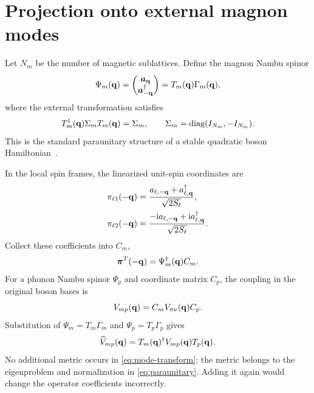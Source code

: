 \section{Projection onto external magnon modes}
\label{sec:magnons}

Let $N_m$ be the number of magnetic sublattices. Define the magnon Nambu spinor
\begin{equation}
\Psi_m(\mathbf q)=
\begin{pmatrix}\bm a_{\mathbf q}\\ \bm a_{-\mathbf q}^\dagger\end{pmatrix}
=T_m(\mathbf q)\Gamma_m(\mathbf q),
\label{eq:magnon-nambu}
\end{equation}
where the external transformation satisfies
\begin{equation}
T_m^\dagger(\mathbf q)\Sigma_m T_m(\mathbf q)=\Sigma_m,
\qquad
\Sigma_m=\operatorname{diag}(I_{N_m},-I_{N_m}).
\label{eq:paraunitary}
\end{equation}
This is the standard paraunitary structure of a stable quadratic boson Hamiltonian~\cite{Colpa1978}.

In the local spin frames, the linearized unit-spin coordinates are
\begin{align}
\pi_{\ell1}(-\mathbf q)
&=\frac{a_{\ell,-\mathbf q}+a_{\ell,\mathbf q}^\dagger}{\sqrt{2S_\ell}},\\
\pi_{\ell2}(-\mathbf q)
&=\frac{-\mathrm{i} a_{\ell,-\mathbf q}+\mathrm{i} a_{\ell,\mathbf q}^\dagger}{\sqrt{2S_\ell}}.
\label{eq:hp-linear}
\end{align}
Collect these coefficients into $C_m$,
\begin{equation}
\bm\pi^T(-\mathbf q)=\Psi_m^\dagger(\mathbf q)C_m.
\label{eq:cm-map}
\end{equation}
For a phonon Nambu spinor $\Psi_p$ and coordinate matrix $C_p$, the coupling in the original boson bases is
\begin{equation}
V_{mp}(\mathbf q)=C_m V_{\pi\nu}(\mathbf q)C_p.
\label{eq:nambu-coupling}
\end{equation}
Substitution of $\Psi_m=T_m\Gamma_m$ and $\Psi_p=T_p\Gamma_p$ gives
\begin{equation}
\widetilde V_{mp}(\mathbf q)
=T_m(\mathbf q)^\dagger V_{mp}(\mathbf q)T_p(\mathbf q).
\label{eq:mode-transform}
\end{equation}
No additional metric occurs in \cref{eq:mode-transform}; the metric belongs to the eigenproblem and normalization in \cref{eq:paraunitary}. Adding it again would change the operator coefficients incorrectly.

